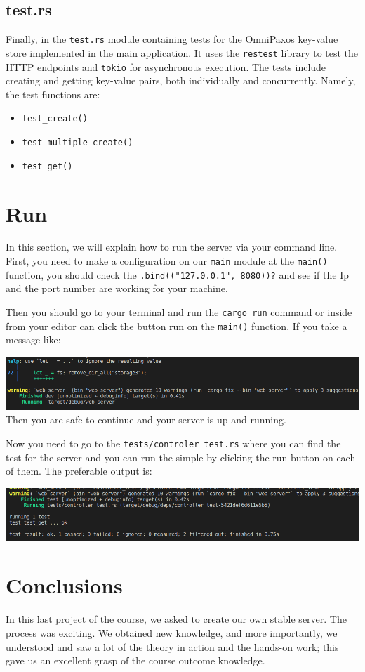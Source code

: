 \documentclass[a4paper, 11pt]{article}
\begin{document}
\subsection{test.rs}
Finally, in the \verb|test.rs| module containing tests for the OmniPaxos key-value store implemented in the main application. It uses the \verb|restest| library to test the HTTP endpoints and \verb|tokio| for asynchronous execution. The tests include creating and getting key-value pairs, both individually and concurrently.
Namely, the test functions are:
\begin{itemize}
    \item \verb|test_create()|
    \item \verb|test_multiple_create()|
    \item \verb|test_get()|
\end{itemize}

\section{Run}
\par
In this section, we will explain how to run the server via your command line. First, you need to make a configuration on our \verb|main| module at the \verb|main()| function, you should check the \verb|.bind(("127.0.0.1", 8080))?| and see if the Ip and the port number are working for your machine.
\par
Then you should go to your terminal and run the \verb|cargo run| command or inside from your editor can click the button run on the \verb|main()| function. If you take a message like:\par
\includegraphics[width=\textwidth,keepaspectratio]{Run.png}
Then you are safe to continue and your server is up and running.
\par
Now you need to go to the \verb|tests/controler_test.rs| where you can find the test for the server and you can run the simple by clicking the run button on each of them. The preferable output is:\par
\includegraphics[width=\textwidth,keepaspectratio]{Test1.png}


\section{Conclusions}
In this last project of the course, we asked to create our own stable server. The process was exciting. We obtained new knowledge, and more importantly, we understood and saw a lot of the theory in action and the hands-on work; this gave us an excellent grasp of the course outcome knowledge.
\end{document}
